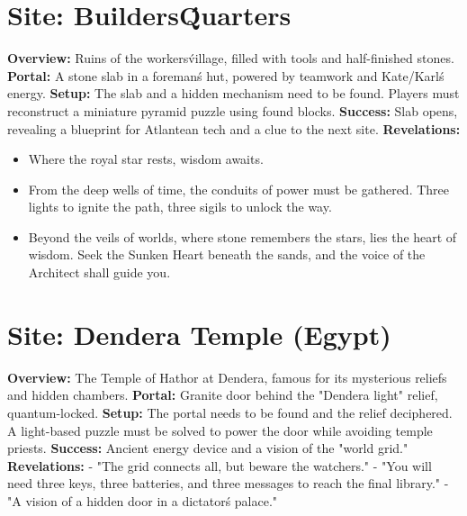 \documentclass[12pt]{article}
\begin{document}
\hrulefill

\section*{Site: Builders\' Quarters}
\textbf{Overview:}
Ruins of the workers\' village, filled with tools and half-finished stones.
\textbf{Portal:}
A stone slab in a foreman\'s hut, powered by teamwork and Kate/Karl\'s energy.
\textbf{Setup:}
The slab and a hidden mechanism need to be found. Players must reconstruct a miniature pyramid puzzle using found blocks.
\textbf{Success:}
Slab opens, revealing a blueprint for Atlantean tech and a clue to the next site.
\textbf{Revelations:}
\begin{itemize}
  \item Where the royal star rests, wisdom awaits.
  \item From the deep wells of time, the conduits of power must be gathered. Three lights to ignite the path, three sigils to unlock the way.
  \item Beyond the veils of worlds, where stone remembers the stars, lies the heart of wisdom. Seek the Sunken Heart beneath the sands, and the voice of the Architect shall guide you.
\end{itemize}

\hrulefill

\section*{Site: Dendera Temple (Egypt)}
\textbf{Overview:}
The Temple of Hathor at Dendera, famous for its mysterious reliefs and hidden chambers.
\textbf{Portal:}
Granite door behind the "Dendera light" relief, quantum-locked.
\textbf{Setup:}
The portal needs to be found and the relief deciphered. A light-based puzzle must be solved to power the door while avoiding temple priests.
\textbf{Success:}
Ancient energy device and a vision of the "world grid."
\textbf{Revelations:}
- "The grid connects all, but beware the watchers."
- "You will need three keys, three batteries, and three messages to reach the final library."
- "A vision of a hidden door in a dictator\'s palace."

\hrulefill
\end{document}
